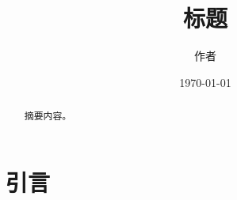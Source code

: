 \documentclass[aps,prl,reprint,groupedaddress]{revtex4-2}
\begin{document}

\title{标题}


\author{作者}


\date{\today}

\begin{abstract}
摘要内容。
\end{abstract}


\maketitle
\pagestyle{fancy}
\thispagestyle{fancy}

\section{引言}
\end{document}

